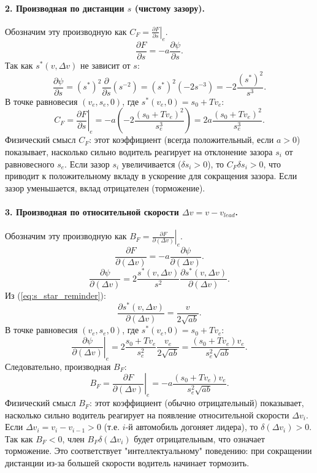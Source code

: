 \documentclass[12pt, a4paper]{article}
\begin{document}
\paragraph{2. Производная по дистанции $s$ (чистому зазору).}
Обозначим эту производную как $C_F = \left.\frac{\partial F}{\partial s}\right|_e$.
\[ \frac{\partial F}{\partial s} = -a \frac{\partial \psi}{\partial s}. \]
Так как $s^*(v, \Delta v)$ не зависит от $s$:
\[ \frac{\partial \psi}{\partial s} = (s^*)^2 \frac{\partial}{\partial s} (s^{-2}) = (s^*)^2 (-2 s^{-3}) = -2 \frac{(s^*)^2}{s^3}. \]
В точке равновесия $(v_e, s_e, 0)$, где $s^*(v_e,0) = s_0+Tv_e$:
\begin{equation}
\label{eq:df_ds_C}
C_F = \left.\frac{\partial F}{\partial s}\right|_e = -a \left(-2 \frac{(s_0+Tv_e)^2}{s_e^3}\right) = 2a \frac{(s_0+Tv_e)^2}{s_e^3}.
\end{equation}
Физический смысл $C_F$: этот коэффициент (всегда положительный, если $a>0$) показывает, насколько сильно водитель реагирует на отклонение зазора $s_i$ от равновесного $s_e$. Если зазор $s_i$ увеличивается ($\delta s_i > 0$), то $C_F \delta s_i > 0$, что приводит к положительному вкладу в ускорение для сокращения зазора. Если зазор уменьшается, вклад отрицателен (торможение).

\paragraph{3. Производная по относительной скорости $\Delta v = v - v_{lead}$.}
Обозначим эту производную как $B_F = \left.\frac{\partial F}{\partial (\Delta v)}\right|_e$.
\[ \frac{\partial F}{\partial (\Delta v)} = -a \frac{\partial \psi}{\partial (\Delta v)}. \]
\[ \frac{\partial \psi}{\partial (\Delta v)} = 2 \frac{s^*(v, \Delta v)}{s^2} \frac{\partial s^*(v, \Delta v)}{\partial (\Delta v)}. \]
Из (\ref{eq:s_star_reminder}):
\[ \frac{\partial s^*(v, \Delta v)}{\partial (\Delta v)} = \frac{v}{2 \sqrt{ab}}. \]
В точке равновесия $(v_e, s_e, 0)$, где $s^*(v_e,0) = s_0+Tv_e$:
\[ \left.\frac{\partial \psi}{\partial (\Delta v)}\right|_e = 2 \frac{s_0+Tv_e}{s_e^2} \frac{v_e}{2 \sqrt{ab}} = \frac{(s_0+Tv_e)v_e}{s_e^2 \sqrt{ab}}. \]
Следовательно, производная $B_F$:
\begin{equation}
\label{eq:df_ddv_B}
B_F = \left.\frac{\partial F}{\partial (\Delta v)}\right|_e = -a \frac{(s_0+Tv_e)v_e}{s_e^2 \sqrt{ab}}.
\end{equation}
Физический смысл $B_F$: этот коэффициент (обычно отрицательный) показывает, насколько сильно водитель реагирует на появление относительной скорости $\Delta v_i$. Если $\Delta v_i = v_i - v_{i-1} > 0$ (т.е. $i$-й автомобиль догоняет лидера), то $\delta(\Delta v_i) > 0$. Так как $B_F < 0$, член $B_F \delta(\Delta v_i)$ будет отрицательным, что означает торможение. Это соответствует "интеллектуальному" поведению: при сокращении дистанции из-за большей скорости водитель начинает тормозить.
\end{document}
